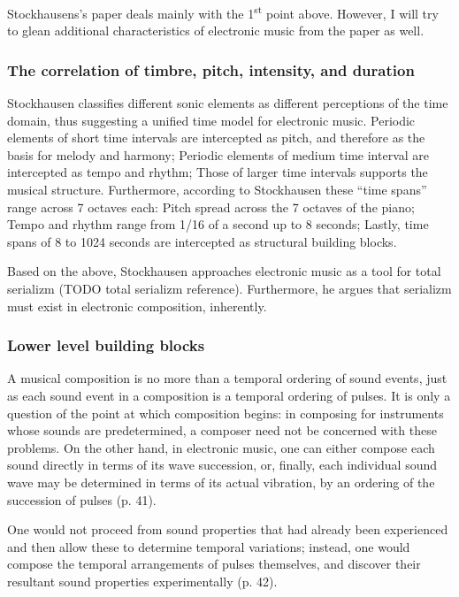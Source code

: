 \documentclass[a4paper,11pt]{article}
\newenvironment{MyShadequote}[1][]
    {\begin{mdframed}[style=MyShadeQuoteStyle,#1]}
    {\end{mdframed}}
\begin{document}
Stockhausens's paper deals mainly with the 1\textsuperscript{st} point above.
However, I will try to glean additional characteristics of electronic music from the paper as well.

\subsubsection{The correlation of timbre, pitch, intensity, and duration}
\label{subs:stockhausen:time}

Stockhausen classifies different sonic elements as different perceptions of the time domain, thus suggesting a unified time model for electronic music.
Periodic elements of short time intervals are intercepted as pitch, and therefore as the basis for melody and harmony;
Periodic elements of medium time interval are intercepted as tempo and rhythm;
Those of larger time intervals supports the musical structure.
Furthermore, according to Stockhausen these ``time spans'' range across 7 octaves each:
Pitch spread across the 7 octaves of the piano;
Tempo and rhythm range from 1/16 of a second up to 8 seconds;
Lastly, time spans of 8 to 1024 seconds are intercepted as structural building blocks.

Based on the above, Stockhausen approaches electronic music as a tool for total serializm (TODO total serializm reference).
Furthermore, he argues that serializm must exist in electronic composition, inherently.

\subsubsection{Lower level building blocks}
\label{subs:stockhausen:sound}

\begin{MyShadequote}
  A musical composition is no more than a temporal ordering of sound events, just as each sound event in a composition is a temporal ordering of pulses.
  It is only a question of the point at which composition begins:
  in composing for instruments whose sounds are predetermined, a composer need not be concerned with these problems.
  On the other hand, in electronic music, one can either compose each sound directly in terms of its wave succession, or, finally, each individual sound wave may be determined in terms of its actual vibration, by an ordering of the succession of pulses (p. 41).
\end{MyShadequote}

\begin{MyShadequote}
  One would not proceed from sound properties that had already been experienced and then allow these to determine temporal variations;
  instead, one would compose the temporal arrangements of pulses themselves, and discover their resultant sound properties experimentally (p. 42).
\end{MyShadequote}
\end{document}
